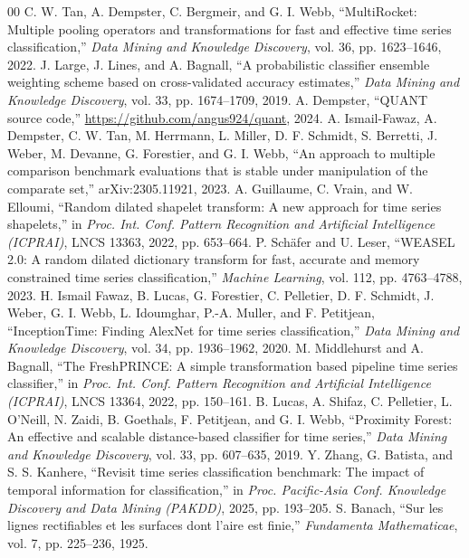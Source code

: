 \documentclass[conference]{IEEEtran}
\begin{document}
\begin{thebibliography}{00}
 C. W. Tan, A. Dempster, C. Bergmeir, and G. I. Webb, ``MultiRocket: Multiple pooling operators and transformations for fast and effective time series classification,'' \textit{Data Mining and Knowledge Discovery}, vol. 36, pp. 1623--1646, 2022.
 J. Large, J. Lines, and A. Bagnall, ``A probabilistic classifier ensemble weighting scheme based on cross-validated accuracy estimates,'' \textit{Data Mining and Knowledge Discovery}, vol. 33, pp. 1674--1709, 2019.
 A. Dempster, ``QUANT source code,'' \url{https://github.com/angus924/quant}, 2024.
 A. Ismail-Fawaz, A. Dempster, C. W. Tan, M. Herrmann, L. Miller, D. F. Schmidt, S. Berretti, J. Weber, M. Devanne, G. Forestier, and G. I. Webb, ``An approach to multiple comparison benchmark evaluations that is stable under manipulation of the comparate set,'' arXiv:2305.11921, 2023.
 A. Guillaume, C. Vrain, and W. Elloumi, ``Random dilated shapelet transform: A new approach for time series shapelets,'' in \textit{Proc. Int. Conf. Pattern Recognition and Artificial Intelligence (ICPRAI)}, LNCS 13363, 2022, pp. 653--664.
 P. Sch\"afer and U. Leser, ``WEASEL 2.0: A random dilated dictionary transform for fast, accurate and memory constrained time series classification,'' \textit{Machine Learning}, vol. 112, pp. 4763--4788, 2023.
 H. Ismail Fawaz, B. Lucas, G. Forestier, C. Pelletier, D. F. Schmidt, J. Weber, G. I. Webb, L. Idoumghar, P.-A. Muller, and F. Petitjean, ``InceptionTime: Finding AlexNet for time series classification,'' \textit{Data Mining and Knowledge Discovery}, vol. 34, pp. 1936--1962, 2020.
 M. Middlehurst and A. Bagnall, ``The FreshPRINCE: A simple transformation based pipeline time series classifier,'' in \textit{Proc. Int. Conf. Pattern Recognition and Artificial Intelligence (ICPRAI)}, LNCS 13364, 2022, pp. 150--161.
 B. Lucas, A. Shifaz, C. Pelletier, L. O'Neill, N. Zaidi, B. Goethals, F. Petitjean, and G. I. Webb, ``Proximity Forest: An effective and scalable distance-based classifier for time series,'' \textit{Data Mining and Knowledge Discovery}, vol. 33, pp. 607--635, 2019.
 Y. Zhang, G. Batista, and S. S. Kanhere, ``Revisit time series classification benchmark: The impact of temporal information for classification,'' in \textit{Proc. Pacific-Asia Conf. Knowledge Discovery and Data Mining (PAKDD)}, 2025, pp. 193--205.
 S. Banach, ``Sur les lignes rectifiables et les surfaces dont l'aire est finie,'' \textit{Fundamenta Mathematicae}, vol. 7, pp. 225--236, 1925.

\end{thebibliography}
\end{document}
